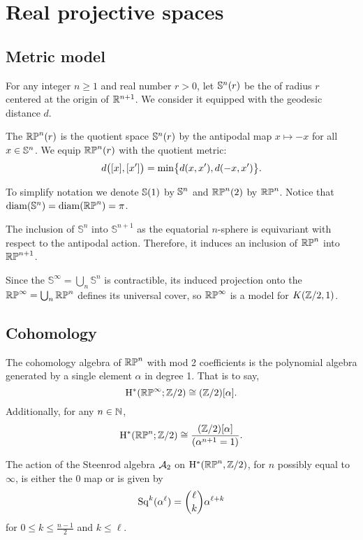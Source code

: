 
\section{Real projective spaces}

\subsection{Metric model}

For any integer $n \geq 1$ and real number $r > 0$, let $\bS^n(r)$ be the  of radius $r$ centered at the origin of $\R^{n+1}$.
We consider it equipped with the geodesic distance $d$.

The  $\rp^n(r)$ is the quotient space $\bS^n(r)$ by the antipodal map $x \mapsto -x$ for all $x \in \bS^n$.
We equip $\rp^n(r)$ with the quotient metric:
\[
d\big([x],[x']\big) =
\min\set[\big]{d(x, x'), d(-x, x')}.
\]

To simplify notation we denote $\bS(1)$ by $\bS^n$ and $\rp^n(2)$ by $\rp^n$.
Notice that $\diam(\bS^n) = \diam(\rp^n) = \pi$.

The inclusion of \(\mathbb{S}^n\) into \(\mathbb{S}^{n+1}\) as the equatorial $n$-sphere is equivariant with respect to the antipodal action.
Therefore, it induces an inclusion of \(\rp^n\) into \(\rp^{n+1}\).

Since the  \(\mathbb{S}^\infty = \bigcup_n \mathbb{S}^n\) is contractible, its induced projection onto the  $\rp^\infty = \bigcup_n \rp^n$ defines its universal cover, so $\rp^\infty$ is a model for \(K(\Z/2, 1)\).

\subsection{Cohomology}

The cohomology algebra of $\rp^n$ with mod 2 coefficients is the polynomial algebra generated by a single element $\alpha$ in degree 1.
That is to say,
\[
\rH^\ast(\rp^\infty; \Z/2) \cong (\Z/2)[\alpha].
\]
Additionally, for any $n \in \N$,
\[
\rH^\ast(\rp^n; \Z/2) \cong \frac{(\Z/2)[\alpha]}{(\alpha^{n+1} = 1)}.
\]

The action of the Steenrod algebra $\cA_2$ on $\rH^*(\rp^n, \Z/2)$, for $n$ possibly equal to $\infty$, is either the 0 map or is given by
\[
\Sq^k(\alpha^\ell) = \binom{\ell}{k}\alpha^{\ell+k}
\]
for $0 \leq k \leq \frac{n-1}{2}$ and $k \leq \ell$.

